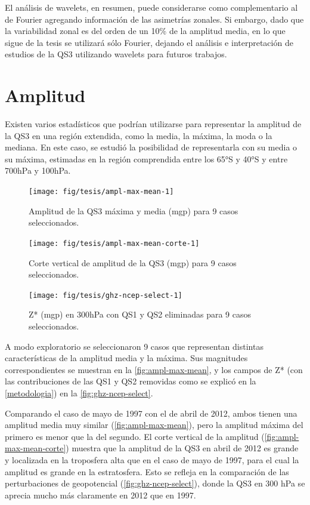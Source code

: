 \documentclass[spanish,a4paper,12pt,oneside]{book}
\begin{document}
El análisis de wavelets, en resumen, puede considerarse como
complementario al de Fourier agregando información de las asimetrías
zonales. Si embargo, dado que la variabilidad zonal es del orden de un
10\% de la amplitud media, en lo que sigue de la tesis se utilizará sólo
Fourier, dejando el análisis e interpretación de estudios de la QS3
utilizando wavelets para futuros trabajos.

\section{Amplitud}\label{amplitud}

Existen varios estadísticos que podrían utilizarse para representar la
amplitud de la QS3 en una región extendida, como la media, la máxima, la
moda o la mediana. En este caso, se estudió la posibilidad de
representarla con su media o su máxima, estimadas en la región
comprendida entre los 65°S y 40°S y entre 700hPa y 100hPa.

\begin{figure}
\texttt{[image: fig/tesis/ampl-max-mean-1]} \caption{Amplitud de la QS3 máxima y media (mgp) para 9 casos seleccionados.}\label{fig:ampl-max-mean}
\end{figure}

\begin{figure}
\texttt{[image: fig/tesis/ampl-max-mean-corte-1]} \caption{Corte vertical de amplitud de la QS3 (mgp) para 9 casos seleccionados.}\label{fig:ampl-max-mean-corte}
\end{figure}

\begin{figure}
\texttt{[image: fig/tesis/ghz-ncep-select-1]} \caption{Z* (mgp) en 300hPa con QS1 y QS2 eliminadas para 9 casos seleccionados.}\label{fig:ghz-ncep-select}
\end{figure}

A modo exploratorio se seleccionaron 9 casos que representan distintas
características de la amplitud media y la máxima. Sus magnitudes
correspondientes se muestran en la \autoref{fig:ampl-max-mean}, y los
campos de Z* (con las contribuciones de las QS1 y QS2 removidas como se
explicó en la \autoref{metodologia}) en la
\autoref{fig:ghz-ncep-select}.

Comparando el caso de mayo de 1997 con el de abril de 2012, ambos tienen
una amplitud media muy similar (\autoref{fig:ampl-max-mean}), pero la
amplitud máxima del primero es menor que la del segundo. El corte
vertical de la amplitud (\autoref{fig:ampl-max-mean-corte}) muestra que
la amplitud de la QS3 en abril de 2012 es grande y localizada en la
troposfera alta que en el caso de mayo de 1997, para el cual la amplitud
es grande en la estratosfera. Esto se refleja en la comparación de las
perturbaciones de geopotencial (\autoref{fig:ghz-ncep-select}), donde la
QS3 en 300 hPa se aprecia mucho más claramente en 2012 que en 1997.
\end{document}
